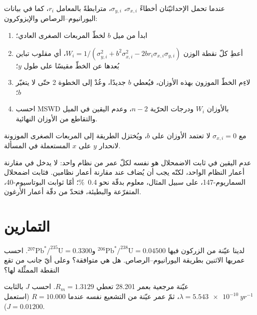 \begin{method}\label{met:b3:advanced-geochronology:york}
عندما تحمل الإحداثيّتان أخطاءً $\sigma_{x,i}$، $\sigma_{y,i}$، مترابطةً
بالمعامل $r_i$، كما في بيانات اليورانيوم--الرصاص والإيزوكرون:
\begin{enumerate}
\item ابدأ من ميل $b$ لخطّ المربعات الصغرى العادي؛
\item أعطِ كلّ نقطة الوزن $W_i = 1/(\sigma_{y,i}^2 + b^2\sigma_{x,i}^2 -
2br_i\sigma_{x,i}\sigma_{y,i})$، أي مقلوب تباين بُعدها عن
الخطّ مقيسًا على طول $y$؛
\item لاءِم الخطّ الموزون بهذه الأوزان، فيُعطي $b$ جديدًا، وعُدْ
إلى الخطوة 2 حتّى لا يتغيّر $b$؛
\item احسب MSWD بالأوزان $W_i$ ودرجات الحرّية $n - 2$،
وعدم اليقين في الميل والتقاطع من الأوزان النهائية.
\end{enumerate}
مع $\sigma_{x,i} = 0$ لا تعتمد الأوزان على $b$، ويُختزل
الطريقة إلى المربعات الصغرى الموزونة لانحدار $y$ على $x$ المستعملة في المسألة.
\end{method}

عدم اليقين في ثابت الاضمحلال هو نفسه لكلّ عمر من نظام واحد:
لا يدخل في مقارنة أعمار النظام الواحد، لكنّه يجب أن يُضاف
عند مقارنة أعمار نظامين. فثابت اضمحلال السماريوم-147، على سبيل المثال،
معلوم بدقّة نحو \qty{0.4}{\percent}؛ أمّا ثوابت البوتاسيوم-40،
المتفرّعة والبطيئة، فتحدّ من دقّة أعمار الأرغون.


\section{التمارين}

\begin{exercise}[$\star$]\label{exo:b3:advanced-geochronology:1}
لدينا عيّنة من الزركون فيها $^{206}\mathrm{Pb}^*/^{238}\mathrm{U} = 0.04500$
و$^{207}\mathrm{Pb}^*/^{235}\mathrm{U} = 0.3300$. احسب عمريها الاثنين
بطريقة اليورانيوم--الرصاص. هل هي متوافقة؟ وعلى أيّ جانب من 
تقع النقطة الممثِّلة لها؟
\end{exercise}

\begin{exercise}[$\star$]\label{exo:b3:advanced-geochronology:2}
عيّنة مرجعية بعمر \qty{28.201}{\Ma} تعطي $R_m = 1.3129$. احسب $J$ بالثابت $\lambda
= \qty{5.543e-10}{yr^{-1}}$، ثمّ عمر عيّنة من التشعيع نفسه
عندما $R = 10.000$ (استعمل $J = 0.01200$).
\end{exercise}


